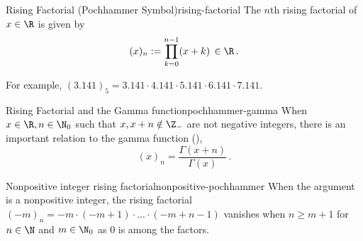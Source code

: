 \begin{definition}{Rising Factorial (Pochhammer Symbol)}{rising-factorial}
  The $n$th rising factorial of $x \in \R$ is given by
  $$(x)_n := \prod_{k=0}^{n-1} (x+k) \,\in \R\,.$$
\end{definition}

For example, $(3.141)_5 = 3.141 \cdot 4.141 \cdot 5.141 \cdot 6.141 \cdot 7.141$.

\begin{remark}{Rising Factorial and the Gamma function}{pochhammer-gamma}
  When $x \in \R, n \in \N_0$ such that $x, x+n \notin \Z_-$ are not negative integers, there is an important relation to the gamma function (),
  $$(x)_n = \frac{\Gamma(x+n)}{\Gamma(x)}\,.$$
\end{remark}

\begin{remark}{Nonpositive integer rising factorial}{nonpositive-pochhammer}
  When the argument is a nonpositive integer, the rising factorial
  $(-m)_n = -m \cdot (-m+1) \cdot ... \cdot (-m+n-1)$
  vanishes when $n \ge m+1$ for $n \in \N$ and $m \in \N_0$ as $0$ is among the factors.
\end{remark}
